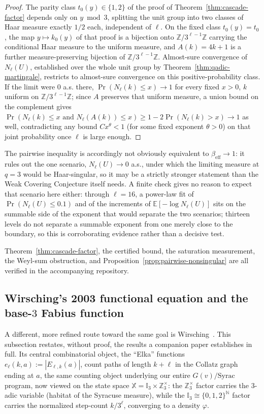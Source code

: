 \documentclass[11pt]{article}
\theoremstyle{definition}
\theoremstyle{remark}
\begin{document}
\begin{proof}
The parity class $t_0(y)\in\{1,2\}$ of the proof of
Theorem~\ref{thm:cascade-factor} depends only on $y\bmod 3$, splitting
the unit group into two classes of Haar measure exactly $1/2$ each,
independent of $\ell$. On the fixed class $t_0(y)=t_0$, the map
$y\mapsto k_0(y)$ of that proof is a bijection onto
$\mathbb{Z}/3^{\ell-1}\mathbb{Z}$ carrying the conditional Haar measure
to the uniform measure, and $A(k)=4k+1$ is a further measure-preserving
bijection of $\mathbb{Z}/3^{\ell-1}\mathbb{Z}$. Almost-sure convergence
of $N_\ell(U)$, established over the whole unit group by
Theorem~\ref{thm:qadic-martingale}, restricts to almost-sure convergence
on this positive-probability class. If the limit were $0$ a.s. there,
$\Pr(N_\ell(k)\le x)\to1$ for every fixed $x>0$, $k$ uniform on
$\mathbb{Z}/3^{\ell-1}\mathbb{Z}$; since $A$ preserves that uniform
measure, a union bound on the complement gives $\Pr(N_\ell(k)\le
x\text{ and }N_\ell(A(k))\le x)\ge1-2\Pr(N_\ell(k)>x)\to1$ as well,
contradicting any bound $Cx^{\theta}<1$ (for some fixed exponent
$\theta>0$) on that joint probability once $\ell$ is large enough.
\end{proof}

The pairwise inequality is accordingly not obviously equivalent to
$\beta_{\mathrm{eff}}\to1$: it rules out the one scenario,
$N_\ell(U)\to0$ a.s., under which the limiting measure at $q=3$ would be
Haar-singular, so it may be a strictly stronger statement than the
Weak Covering Conjecture itself needs. A finite check gives no reason to
expect that scenario here either: through $\ell=16$, a power-law fit of
$\Pr(N_\ell(U)\le0.1)$ and of the increments of
$\mathbb{E}[-\log N_\ell(U)]$ sits on the summable side of the exponent
that would separate the two scenarios; thirteen levels do not separate a
summable exponent from one merely close to the boundary, so this is
corroborating evidence rather than a decisive test.

Theorem~\ref{thm:cascade-factor}, the certified bound, the saturation
measurement, the Weyl-sum obstruction, and
Proposition~\ref{prop:pairwise-nonsingular} are all verified in the
accompanying repository.

\subsection{Wirsching's 2003 functional equation and the base-$3$
Fabius function}

A different, more refined route toward the same goal is
Wirsching~\cite{Wirsching2003}. This subsection restates, without
proof, the results a companion paper \cite{WirschingCompanion}
establishes in full. Its central combinatorial object, the
``Elka'' functions $e_\ell(k,a):=|E_{\ell,k}(a)|$, count paths of
length $k+\ell$ in the Collatz graph ending at $a$, the same
counting object underlying our entire $G(v)/\mathrm{Syrac}$ program,
now viewed on the state space $\mathbb{X}=\mathbb{I}_3\times
\mathbb{Z}_3^\times$: the $\mathbb{Z}_3^\times$ factor carries the
$3$-adic variable (habitat of the Syracuse measure), while the
$\mathbb{I}_3\cong\{0,1,2\}^{\mathbb{N}}$ factor carries the normalized
step-count $k/3^\ell$, converging to a density $\varphi$.
\end{document}
